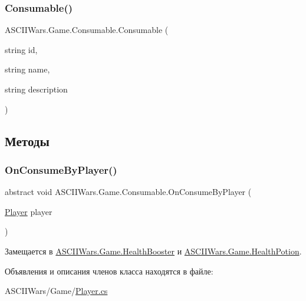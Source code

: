 \subsubsection{\texorpdfstring{Consumable()}{Consumable()}}
{\footnotesize\ttfamily A\+S\+C\+I\+I\+Wars.\+Game.\+Consumable.\+Consumable (\begin{DoxyParamCaption}\item[{string}]{id,  }\item[{string}]{name,  }\item[{string}]{description }\end{DoxyParamCaption})\hspace{0.3cm}{\ttfamily [inline]}}



\subsection{Методы}
\hypertarget{class_a_s_c_i_i_wars_1_1_game_1_1_consumable_a6aac67fe076ca39cb850e3720461fff8}{}\label{class_a_s_c_i_i_wars_1_1_game_1_1_consumable_a6aac67fe076ca39cb850e3720461fff8} 
\subsubsection{\texorpdfstring{On\+Consume\+By\+Player()}{OnConsumeByPlayer()}}
{\footnotesize\ttfamily abstract void A\+S\+C\+I\+I\+Wars.\+Game.\+Consumable.\+On\+Consume\+By\+Player (\begin{DoxyParamCaption}\item[{\hyperlink{class_a_s_c_i_i_wars_1_1_game_1_1_player}{Player}}]{player }\end{DoxyParamCaption})\hspace{0.3cm}{\ttfamily [pure virtual]}}



Замещается в \hyperlink{class_a_s_c_i_i_wars_1_1_game_1_1_health_booster_a0dd6134e102b2b4ea9d143b7cea15568}{A\+S\+C\+I\+I\+Wars.\+Game.\+Health\+Booster} и \hyperlink{class_a_s_c_i_i_wars_1_1_game_1_1_health_potion_a3004d1c2396e9c068ed4e03884afd56c}{A\+S\+C\+I\+I\+Wars.\+Game.\+Health\+Potion}.



Объявления и описания членов класса находятся в файле\+:\begin{DoxyCompactItemize}
\item 
A\+S\+C\+I\+I\+Wars/\+Game/\hyperlink{_player_8cs}{Player.\+cs}\end{DoxyCompactItemize}
